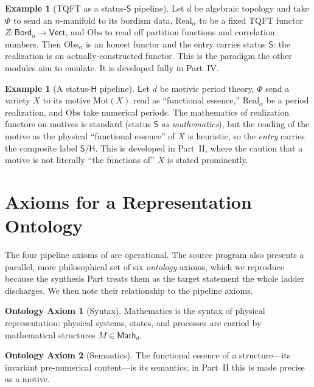 \documentclass[12pt]{article}
\theoremstyle{definition}
\newtheorem{ontaxiom}{Ontology Axiom}
\newtheorem{example}[theorem]{Example}
\theoremstyle{remark}
\newcommand{\Math}{\mathsf{Math}}
\newcommand{\Vect}{\mathsf{Vect}}
\newcommand{\Bord}{\mathsf{Bord}}
\newcommand{\Real}{\mathrm{Real}}
\newcommand{\Obs}{\mathrm{Obs}}
\newcommand{\Sstat}{\mathsf{S}}
\newcommand{\Hstat}{\mathsf{H}}
\begin{document}
\begin{example}[TQFT as a status-$\Sstat$ pipeline]
\label{ex:tqft}
Let $d$ be algebraic topology and take $\Phi$ to send an $n$-manifold to its
bordism data, $\Real_\alpha$ to be a fixed TQFT functor
$Z : \Bord_n \to \Vect$, and $\Obs$ to read off partition functions and
correlation numbers. Then $\Obs_\alpha$ is an honest functor and the entry
carries status $\Sstat$: the realization is an actually-constructed functor.
This is the paradigm the other modules aim to emulate. It is developed fully in
Part~IV.
\end{example}

\begin{example}[A status-$\Hstat$ pipeline]
\label{ex:motive}
Let $d$ be motivic period theory, $\Phi$ send a variety $X$ to its motive
$\mathrm{Mot}(X)$ read as ``functional essence,'' $\Real_\alpha$ be a period
realization, and $\Obs$ take numerical periods. The mathematics of realization
functors on motives is standard (status $\Sstat$ \emph{as mathematics}), but the
reading of the motive as the physical ``functional essence'' of $X$ is
heuristic, so the \emph{entry} carries the composite label $\Sstat/\Hstat$. This
is developed in Part~II, where the caution that a motive is not literally ``the
functions of'' $X$ is stated prominently.
\end{example}

\section{Axioms for a Representation Ontology}
\label{sec:ontology}

The four pipeline axioms of  are operational. The source
program also presents a parallel, more philosophical set of six \emph{ontology}
axioms, which we reproduce because the synthesis Part treats them as the target
statement the whole ladder discharges. We then note their relationship to the
pipeline axioms.

\begin{ontaxiom}[Syntax]
\label{ax:syntax}
Mathematics is the syntax of physical representation: physical systems, states,
and processes are carried by mathematical structures $M \in \Math_d$.
\end{ontaxiom}

\begin{ontaxiom}[Semantics]
\label{ax:semantics}
The functional essence of a structure---its invariant pre-numerical content---is
its semantics; in Part~II this is made precise as a motive.
\end{ontaxiom}
\end{document}
